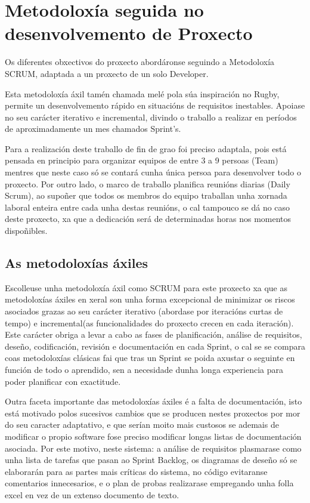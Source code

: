 \chapter{Metodoloxía seguida no desenvolvemento de Proxecto}

Os diferentes obxectivos do proxecto abordáronse seguindo a Metodoloxía SCRUM, adaptada a
un proxecto de un solo Developer.

Esta metodoloxía áxil tamén chamada melé pola súa inspiración no Rugby, permite un
desenvolvemento rápido en situacións de requisitos inestables. Apoiase no seu carácter 
iterativo e incremental, divindo o traballo a realizar en períodos de aproximadamente un mes
chamados Sprint's.

Para a realización deste traballo de fin de grao foi preciso adaptala, pois está pensada en 
principio para organizar equipos de entre 3 a 9 persoas (Team) mentres que neste caso só se contará 
cunha única persoa para desenvolver todo o proxecto. Por outro lado, o marco de 
traballo planifica reunións diarias (Daily Scrum), ao supoñer que todos os membros do equipo 
traballan unha xornada laboral enteira entre cada unha destas reunións, o cal tampouco se dá 
no caso deste proxecto, xa que a dedicación será de determinadas horas nos momentos dispoñibles.

\section{As metodoloxías áxiles}
    Escolleuse unha metodoloxía áxil como SCRUM para este proxecto xa que as metodoloxías áxiles en
    xeral son unha forma excepcional de minimizar os riscos asociados grazas ao seu carácter 
    iterativo (abordase por iteracións curtas de tempo) e incremental(as funcionalidades do proxecto
    crecen en cada iteración). Este carácter obriga a levar a cabo as fases de planificación, análise 
    de requisitos, deseño, codificación, revisión e documentación en cada Sprint, o cal se se 
    compara coas metodoloxías clásicas fai que tras un Sprint se poida axustar o seguinte en función
    de todo o aprendido, sen a necesidade dunha longa experiencia para poder planificar con 
    exactitude.
    
    Outra faceta importante das metodoloxías áxiles é a falta de documentación, isto está motivado 
    polos sucesivos cambios que se producen nestes proxectos por mor do seu caracter adaptativo, e 
    que serían moito mais custosos se ademais de modificar o propio software fose preciso modificar
    longas listas de documentación asociada. Por este motivo, neste sistema: a análise de requisitos 
    plasmarase como unha lista de tarefas que pasan ao Sprint Backlog, os diagramas de deseño só se 
    elaborarán para as partes mais críticas do sistema, no código evitaranse comentarios 
    innecesarios, e o plan de probas realizarase empregando unha folla excel en vez de un extenso 
    documento de texto.


